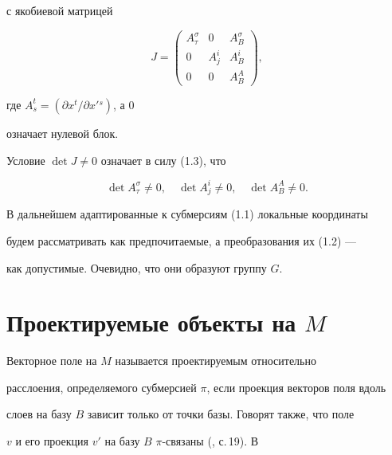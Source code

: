 с якобиевой матрицей


\begin{equation}


J=


\begin{pmatrix}


A^\sigma_\tau & 0 & A^\sigma_B \\


0 & A^i_j & A^i_B \\


0 & 0 & A^A_B


\end{pmatrix}


,


\end{equation}


где $A^t_s=(\partial x^t/\partial x'{}^s)$, а $0$


означает нулевой блок.


Условие $\det J\ne 0$ означает в силу (1.3), что


\begin{equation}


\det A^\sigma_\tau\ne 0,\quad \det A^i_j\ne 0,


\quad \det A^A_B\ne 0.


\end{equation}


В дальнейшем адаптированные к субмерсиям (1.1) локальные координаты


будем рассматривать как предпочитаемые, а преобразования их (1.2) ---


как допустимые. Очевидно, что они образуют группу $G$.


\renewcommand{\baselinestretch}{1.05}





\section{Проектируемые объекты на $M$}





Векторное поле на $M$ называется проектируемым \cite{1} относительно


расслоения, определяемого субмерсией $\pi$, если проекция векторов поля вдоль


слоев на базу $B$ зависит только от точки базы. Говорят также, что поле


$v$ и его проекция $v'$ на базу $B$ $\pi$-связаны (\cite{2}, с.\,19). В


